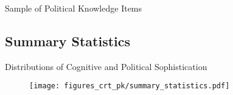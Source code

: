 \documentclass[10pt,table]{beamer}
\begin{document}
\begin{frame}[t, fragile, label = pk_wording]{Sample of Political Knowledge Items}
\vspace{-0.25em}
\hspace{-0.75em}\hyperlink{variables<3>}{}\hspace{0.5em}\hyperlink{app}{}

\end{frame}

\subsection{Summary Statistics}

\begin{frame}[t, fragile, label = summ_stats]{Distributions of Cognitive and Political Sophistication}


\vspace{-10em}
\begin{figure}
\hspace*{-4em}
    \centering
    \texttt{[image: figures\_crt\_pk/summary\_statistics.pdf]}
\end{figure}

\vspace{-3.75em}
\hspace{-0.75em}\hyperlink{data_overview<4>}{}\hspace{0.5em}\hyperlink{app}{}
\end{frame}



\end{document}
